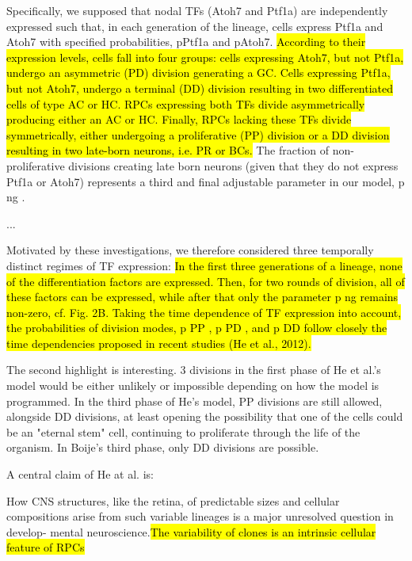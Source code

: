 \begin{longquote}
Specifically, we supposed that nodal TFs (Atoh7 and Ptf1a) are independently
expressed such that, in each generation of the lineage, cells express Ptf1a and Atoh7 with specified
probabilities, pPtf1a and pAtoh7. \hl{According to their expression levels, cells fall into four groups: cells
expressing Atoh7, but not Ptf1a, undergo an asymmetric (PD) division generating a GC. Cells
expressing Ptf1a, but not Atoh7, undergo a terminal (DD) division resulting in two differentiated cells
of type AC or HC. RPCs expressing both TFs divide asymmetrically producing either an AC or HC.
Finally, RPCs lacking these TFs divide symmetrically, either undergoing a proliferative (PP) division
or a DD division resulting in two late-born neurons, i.e. PR or BCs.} The fraction of non-proliferative
divisions creating late born neurons (given that they do not express Ptf1a or Atoh7) represents a third
and final adjustable parameter in our model, p ng .

...

 Motivated by these
investigations, we therefore considered three temporally distinct regimes of TF expression: \hl{In the first
three generations of a lineage, none of the differentiation factors are expressed. Then, for two rounds of
division, all of these factors can be expressed, while after that only the parameter p ng remains non-zero,
cf. Fig. 2B. Taking the time dependence of TF expression into account, the probabilities of division
modes, p PP , p PD , and p DD follow closely the time dependencies proposed in recent studies (He et al.,
2012).}

\end{longquote}

\bigskip

The second highlight is interesting. 3 divisions in the first phase of He et al.'s model would be either unlikely or impossible depending on how the model is programmed. In the third phase of He's model, PP divisions are still allowed, alongside DD divisions, at least opening the possibility that one of the cells could be an "eternal stem" cell, continuing to proliferate through the life of the organism. In Boije's third phase, only DD divisions are possible.

\bigskip

A central claim of He at al. is:

\bigskip

\begin{longquote}
How CNS structures, like the
retina, of predictable sizes and cellular compositions arise from
such variable lineages is a major unresolved question in develop-
mental neuroscience.\hl{The variability of clones is an intrinsic cellular feature of RPCs}
\end{longquote}

